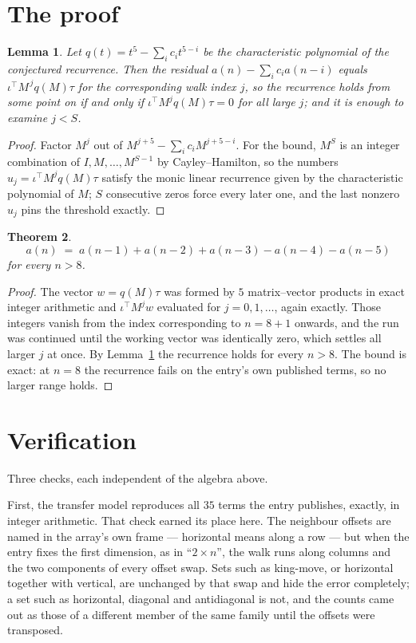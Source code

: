 \documentclass[11pt,a4paper]{article}
\theoremstyle{plain}
\newtheorem{theorem}{Theorem}
\newtheorem{lemma}[theorem]{Lemma}
\theoremstyle{definition}
\begin{document}
\section{The proof}

\begin{lemma}\label{lem:crit}
Let $q(t)=t^{5}-\sum_i c_it^{5-i}$ be the characteristic polynomial of the
conjectured recurrence. Then the residual $a(n)-\sum_ic_ia(n-i)$ equals
$\iota^{\!\top}M^{\,j}q(M)\tau$ for the corresponding walk index $j$, so the
recurrence holds from some point on if and only if $\iota^{\!\top}M^{j}q(M)\tau=0$ for all
large $j$; and it is enough to examine $j<S$.
\end{lemma}

\begin{proof}
Factor $M^{j}$ out of $M^{j+5}-\sum_ic_iM^{j+5-i}$. For the bound, $M^{S}$
is an integer combination of $I,M,\dots,M^{S-1}$ by Cayley--Hamilton, so the numbers
$u_j=\iota^{\!\top}M^{j}q(M)\tau$ satisfy the monic linear recurrence given by the
characteristic polynomial of $M$; $S$ consecutive zeros force every later one, and the last
nonzero $u_j$ pins the threshold exactly.
\end{proof}

\begin{theorem}
\[
a(n)\;=\;a(n-1) + a(n-2) + a(n-3) - a(n-4) - a(n-5)
\]
for every $n>8$.
\end{theorem}

\begin{proof}
The vector $w=q(M)\tau$ was formed by $5$ matrix--vector products in exact integer
arithmetic and $\iota^{\!\top}M^{j}w$ evaluated for $j=0,1,\dots$, again exactly. Those
integers vanish from the index corresponding to $n=8+1$ onwards, and the run was
continued until the working vector was identically zero, which settles all larger $j$ at once.
By Lemma~\ref{lem:crit} the recurrence holds for every $n>8$. The bound is exact: at $n=8$ the recurrence fails on the entry's own published terms, so no larger range holds.
\end{proof}

\section{Verification}

Three checks, each independent of the algebra above.

First, the transfer model reproduces all $35$ terms the entry publishes, exactly, in
integer arithmetic. That check earned its place here. The neighbour offsets are named in the
array's own frame --- horizontal means along a row --- but when the entry fixes the first
dimension, as in ``$2\times n$'', the walk runs along columns and the two components of every
offset swap. Sets such as king-move, or horizontal together with vertical, are unchanged by
that swap and hide the error completely; a set such as horizontal, diagonal and antidiagonal
is not, and the counts came out as those of a different member of the same family until the
offsets were transposed.
\end{document}
